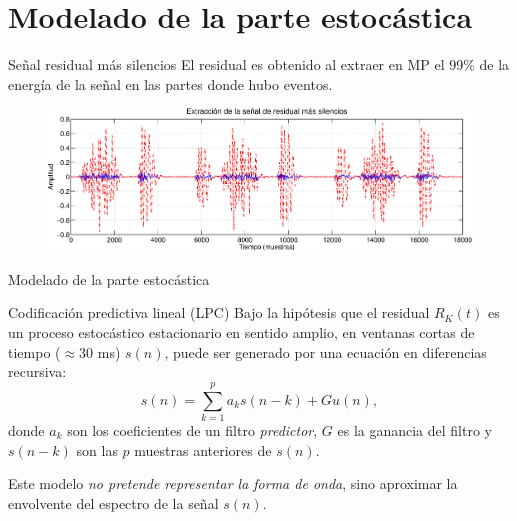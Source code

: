 \documentclass[xcolor=table]{beamer}
\begin{document}
\section{Modelado de la parte estoc\'astica}
\begin{frame}{Se\~nal residual m\'as silencios}
El residual es obtenido al extraer en MP el 99\% de la energ\'ia de la se\~nal en las partes donde hubo eventos.
	\begin{figure}
		\centering
		\includegraphics[scale=0.35]{extraccion_residual.eps}
	\end{figure}
\end{frame}

\begin{frame}{Modelado de la parte estoc\'astica}
		\begin{exampleblock}{Codificaci\'on predictiva lineal (LPC)}
			Bajo la hip\'otesis que el residual $R_{K}(t)$ es un proceso estoc\'astico estacionario en sentido amplio, en ventanas 			cortas de tiempo ($\approx 30$ ms) $s(n)$, puede ser generado por una ecuaci\'on en diferencias recursiva:
			$$ s(n) = \sum_{k=1}^{p}a_{k} s(n-k) + Gu(n),$$
			donde $a_{k}$ son los coeficientes de un filtro \emph{predictor}, $G$ es la ganancia del filtro y $s(n-k)$ son las $p$ muestras anteriores de $s(n)$.
		\end{exampleblock}
		Este modelo \alert{\emph{no pretende representar la forma de onda}}, sino aproximar la envolvente del espectro de la se\~nal $s(n)$.
\end{frame}
\end{document}
